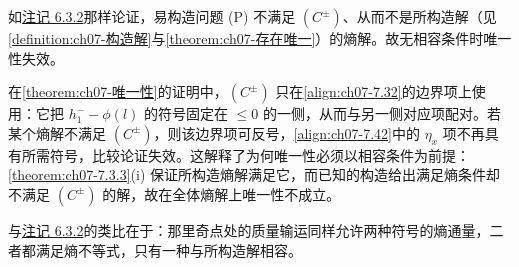 \documentclass[../../main.tex]{subfiles}%
\begin{document}
\begin{remark}\label{remark:ch07-7.2.6}
如\hyperref[remark:ch06-6.3.2]{注记 6.3.2}那样论证，易构造问题 (P) 不满足 $(C^\pm)$、从而不是所构造解（见\cref{definition:ch07-构造解}与\cref{theorem:ch07-存在唯一}）的熵解。故无相容条件时唯一性失效。
\end{remark}

\begin{remark}\label{remark:ch07-唯一性失效动机}
在\cref{theorem:ch07-唯一性}的证明中，$(C^\pm)$ 只在\eqref{align:ch07-7.32}的边界项上使用：它把 $h_1^--\phi(l)$ 的符号固定在 $\leqslant0$ 的一侧，从而与另一侧对应项配对。若某个熵解不满足 $(C^\pm)$，则该边界项可反号，\eqref{align:ch07-7.42}中的 $\eta_x$ 项不再具有所需符号，比较论证失效。这解释了为何唯一性必须以相容条件为前提：\cref{theorem:ch07-7.3.3}(i) 保证所构造熵解满足它，而已知的构造给出满足熵条件却不满足 $(C^\pm)$ 的解，故在全体熵解上唯一性不成立。

与\hyperref[remark:ch06-6.3.2]{注记 6.3.2}的类比在于：那里奇点处的质量输运同样允许两种符号的熵通量，二者都满足熵不等式，只有一种与所构造解相容。
\end{remark}
\end{document}
